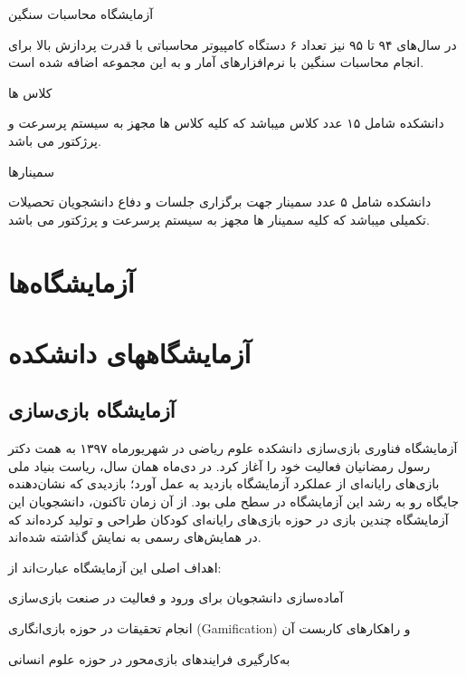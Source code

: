 \documentclass[
  letterpaper,
  DIV=11,
  numbers=noendperiod]{scrreprt}
\begin{document}
آزمایشگاه محاسبات سنگین

در سال‌های ۹۴ تا ۹۵ نیز تعداد ۶ دستگاه کامپیوتر محاسباتی با قدرت پردازش
بالا برای انجام محاسبات سنگین با نرم‌افزارهای آمار و به این مجموعه اضافه
شده است.

کلاس ها

دانشکده شامل ۱۵ عدد کلاس میباشد که کلیه کلاس ها مجهز به سیستم پرسرعت و
پرژکتور می باشد.

سمینارها

دانشکده شامل ۵ عدد سمینار جهت برگزاری جلسات و دفاع دانشجویان تحصیلات
تکمیلی میباشد که کلیه سمینار ها مجهز به سیستم پرسرعت و پرژکتور می باشد.


\chapter{آزمایشگاه‌ها}\label{ux622ux632ux645ux627ux6ccux634ux6afux627ux647ux647ux627}


\chapter{آزمایشگاههای
دانشکده}\label{ux622ux632ux645ux627ux6ccux634ux6afux627ux647ux647ux627ux6cc-ux62fux627ux646ux634ux6a9ux62fux647}

\section{آزمایشگاه
بازی‌سازی}\label{ux622ux632ux645ux627ux6ccux634ux6afux627ux647-ux628ux627ux632ux6ccux633ux627ux632ux6cc}

آزمایشگاه فناوری بازی‌سازی دانشکده علوم ریاضی در شهریورماه ۱۳۹۷ به همت
دکتر رسول رمضانیان فعالیت خود را آغاز کرد. در دی‌ماه همان سال، ریاست
بنیاد ملی بازی‌های رایانه‌ای از عملکرد آزمایشگاه بازدید به عمل آورد؛
بازدیدی که نشان‌دهنده جایگاه رو به رشد این آزمایشگاه در سطح ملی بود. از
آن زمان تاکنون، دانشجویان این آزمایشگاه چندین بازی در حوزه بازی‌های
رایانه‌ای کودکان طراحی و تولید کرده‌اند که در همایش‌های رسمی به نمایش
گذاشته شده‌اند.

اهداف اصلی این آزمایشگاه عبارت‌اند از:

آماده‌سازی دانشجویان برای ورود و فعالیت در صنعت بازی‌سازی

انجام تحقیقات در حوزه بازی‌انگاری (Gamification) و راهکارهای کاربست آن

به‌کارگیری فرایندهای بازی‌محور در حوزه علوم انسانی
\end{document}
